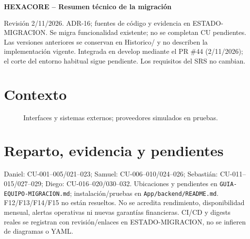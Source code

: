 \documentclass[12pt,a4paper]{article}
\begin{document}
\sloppy
\begin{center}\LARGE\textbf{HEXACORE -- Resumen técnico de la migración}\end{center}
\noindent Revisión 2/11/2026. ADR-16; fuentes de código y evidencia en ESTADO-MIGRACION.
Se migra funcionalidad existente; no se completan CU pendientes. Las versiones anteriores
se conservan en Historico/ y no describen la implementación vigente. Integrada en develop mediante el PR \#44
(2/11/2026); el corte del entorno habitual sigue pendiente. Los requisitos del SRS no cambian.
\tableofcontents
\section{Contexto}
\begin{figure}[H]\centering\HexContexto\caption{Interfaces y sistemas externos; proveedores simulados en pruebas.}\end{figure}

\section{Reparto, evidencia y pendientes}
Daniel: CU-001--005/021--023; Samuel: CU-006--010/024--026; Sebastián:
CU-011--015/027--029; Diego: CU-016--020/030--032. Ubicaciones y pendientes en
\texttt{GUIA-EQUIPO-MIGRACION.md}; instalación/pruebas en \texttt{App/backend/README.md}.
F12/F13/F14/F15 no están resueltos. No se acredita rendimiento, disponibilidad mensual,
alertas operativas ni nuevas garantías financieras. CI/CD y digests reales se registran
con revisión/enlaces en ESTADO-MIGRACION, no se infieren de diagramas o YAML.
\end{document}
